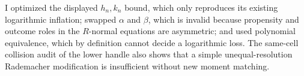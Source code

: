 I optimized the displayed \(h_n,k_n\) bound, which only reproduces its existing logarithmic inflation; swapped \(\alpha\) and \(\beta\), which is invalid because propensity and outcome roles in the \(R\)-normal equations are asymmetric; and used polynomial equivalence, which by definition cannot decide a logarithmic loss.  The same-cell collision audit of the lower handle also shows that a simple unequal-resolution Rademacher modification is insufficient without new moment matching.